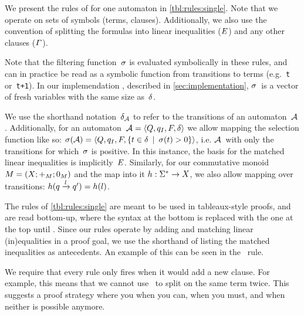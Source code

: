 \documentclass[acmsmall,review,anonymous,screen]{acmart}\settopmatter{printfolios=true,printccs=false,printacmref=true}
\theoremstyle{definition}
\begin{document}
We present the rules of \Calculus{} for one automaton in
\cref{tbl:rules:single}. Note that we operate on sets of symbols (terms,
clauses). Additionally, we also use the convention of splitting the formulas
into linear inequalities ($E$) and any other clauses
($\varGamma$).

Note that the filtering function~$\operatorname{\sigma}$ is evaluated symbolically in these
rules, and can in practice be read as a symbolic function from transitions to
terms (e.g.~\texttt{t} or~\texttt{t+1}). In our implemendation \Catra{},
described in \cref{sec:implementation}, $\operatorname{\sigma}$~is a vector of fresh variables
with the same size as~$\delta$.

We use the shorthand notation~$\delta_{\mathcal{A}}$ to refer to the
transitions of an automaton~$\mathcal{A}$. Additionally, for an
automaton~$\mathcal{A} = \left\langle Q, q_I, F, \delta\right\rangle$ we allow mapping the selection function
like so: $\operatorname{\sigma}(\mathcal{A}) = \left\langle Q, q_I, F,
\left\{t \in \delta \:\mid\: \operatorname{\sigma}(t) > 0\right\}\right\rangle$, i.e.
$\mathcal{A}$~with only the transitions for which~$\operatorname{\sigma}$ is positive. In this
instance, the basis for the matched linear inequalities is
implicitly~$E$. Similarly, for our commutative monoid $M =
\left(X;+_{M};0_{M}\right)$ and the map into it $h : \Sigma^*
\rightarrow X$, we also allow mapping over transitions:
$h(q \xrightarrow{l} q') = h(l)$.

The rules of \cref{tbl:rules:single} are meant to be used in tableaux-style
proofs, and are read bottom-up, where the syntax at the bottom is replaced with
the one at the top until . Since
our rules operate by adding and matching linear (in)equalities in a proof goal,
we use the shorthand of listing the matched inequalities as antecedents. An
example of this can be seen in the~\Propagate{} rule. 

We require that every rule only fires when it would add a new clause. For
example, this means that we cannot use~\Split{} to split on the same term twice.
This suggests a proof strategy where you \Propagate{} when you can, \Split{}
when you must, and \Subsume{} when neither is possible anymore.
\end{document}
